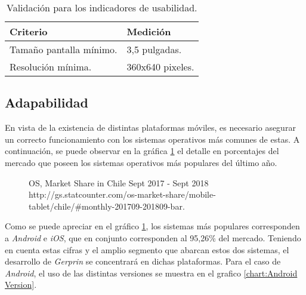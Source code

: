 \begin{table}[H]
    \caption[Validación para los indicadores de usabilidad.] {Validación para los indicadores de usabilidad.}
    \label{tbl:Criterios de Validación usabilidad}
    \begin{tabular}{|p{}|p{}|}
        \hline
        \textbf{Criterio} &  \textbf{Medición}\\
    	\hline
    	\hline
    	Tamaño pantalla mínimo. & 3,5 pulgadas. \\ \hline
		Resolución mínima.  & 360x640 pixeles. \\ 
        \hline
    \end{tabular}
\end{table}

\subsection{Adapabilidad}

En vista de la existencia de distintas plataformas móviles, es necesario asegurar un correcto funcionamiento con los sistemas operativos más comunes de estas. A continuación, se puede observar en la gráfica \ref{chart:OS} el detalle en porcentajes del mercado que poseen los sistemas operativos más populares del último año.

\begin{figure}[H]
	\centering
	\caption[OS, Market Share in Chile Sept 2017 - Sept 2018.]{OS, Market Share in Chile Sept 2017 - Sept 2018 \\ http://gs.statcounter.com/os-market-share/mobile-tablet/chile/\#monthly-201709-201809-bar.}
	\label{chart:OS}
	\begin{bchart}[step=10, max=100, width=.8\textwidth, unit=\%]
	\end{bchart}
\end{figure}

Como se puede apreciar en el gráfico \ref{chart:OS}, los sistemas más populares corresponden a \textit{Android} e \textit{iOS}, que en conjunto corresponden al 95,26\% del mercado. Teniendo en cuenta estas cifras y el amplio segmento que abarcan estos dos sistemas, el desarrollo de \textit{Gerprin} se concentrará en dichas plataformas. Para el caso de \textit{Android}, el uso de las distintas versiones se muestra en el grafico \ref{chart:Android Version}.

